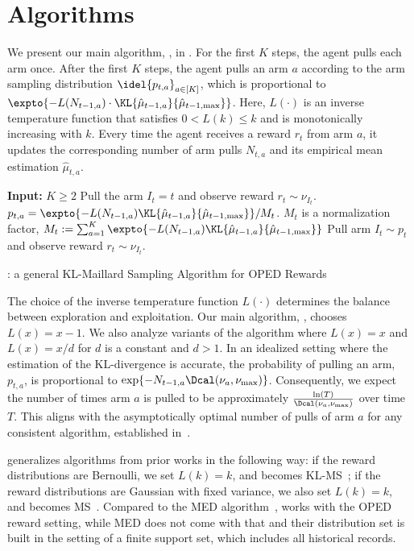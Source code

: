 \section{Algorithms} 

We present our main algorithm, \gexpklms, in . For the first $K$ steps, the agent pulls each arm once. After the first $K$ steps, the agent pulls an arm $a$ according to the arm sampling distribution $\idel{p_{t, a}}_{a\in[K]}$, which is proportional to $\expto{-L(N_{t-1,a}) \cdot \KL{\hmu_{t-1,a}}{\hmu_{t-1, \max}}}$. Here, $L(\cdot)$ is an inverse temperature function that satisfies $0 < L(k) \leq k$ and is monotonically increasing with $k$.
Every time the agent receives a reward $r_t$ from arm $a$, it updates the corresponding number of arm pulls $N_{t, a}$ and its empirical mean estimation $\hat{\mu}_{t, a}$.

    \begin{algorithm}[ht]
    \begin{algorithmic} 
    \STATE \textbf{Input:} $K\geq 2$
            \STATE Pull the arm $I_t=t$ and observe reward $r_t \sim \nu_{I_t}$.
        \ELSE 
            \STATE $p_{t,a} = \expto{-L(N_{t-1,a}) \KL{\hmu_{t-1,a}}{\hmu_{t-1,\max} } } / M_t$.
            \STATE $M_t$ is a normalization factor, $M_t := \sum_{a=1}^K \expto{-L(N_{t-1,a})\KL{\hmu_{t-1,a}}{\hmu_{t-1,\max} }}$          
            \STATE Pull arm $I_t \sim p_t$ and observe reward $r_t \sim \nu_{I_t}$.
        \ENDIF
    \ENDFOR
    \end{algorithmic}
    \caption{\gexpklms: a general KL-Maillard Sampling Algorithm for OPED Rewards} 
    \label{alg:general-exp-kl-ms}
    \end{algorithm}

The choice of the inverse temperature function $L(\cdot)$ determines the balance between exploration and exploitation.
Our main algorithm, \expklms, chooses $L(x) = x - 1$.
We also analyze variants of the algorithm where $L(x) = x$ and $L(x) = x/d$ for $d$ is a constant and $d > 1$.
In an idealized setting where the estimation of the KL-divergence is accurate, the probability of pulling an arm, $p_{t, a}$, is proportional to $\exp\{- N_{t-1, a} \Dcal(\nu_a, \nu_{\max})\}$. Consequently, we expect the number of times arm $a$ is pulled to be approximately $\frac{\ln(T)}{\Dcal(\nu_a, \nu_{\max})}$ over time $T$. This aligns with the asymptotically optimal number of pulls of arm $a$ for any consistent algorithm, established in~\citet{lai85asymptotically}.

 generalizes algorithms from prior works in the following way: if the reward distributions are Bernoulli, we set $L(k) = k$, and \gexpklms becomes KL-MS~\citep{qin2023kullback}; if the reward distributions are Gaussian with fixed variance, we also set $L(k) = k$, and \gexpklms becomes MS~\citep{bian2022maillard}. Compared to the MED algorithm~\citep{honda2011asymptotically}, \gexpklms works with the OPED reward setting, while MED does not come with that and their distribution set is built in the setting of a finite support set, which includes all historical records.
